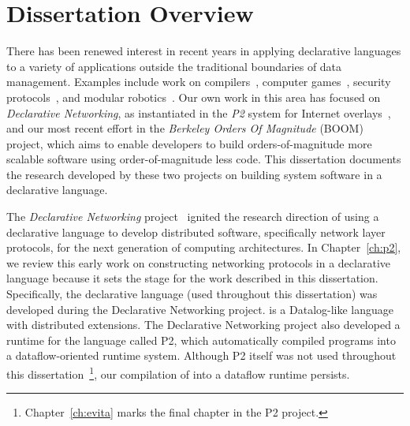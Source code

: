 \chapter[Dissertation Overview]{Dissertation Overview}
\label{ch:overview}

There has been renewed interest in recent years in applying declarative languages to a variety of 
applications outside the traditional boundaries of data management. Examples include work on 
compilers~\cite{lam05context}, computer games~\cite{white-sigmod07}, security protocols~\cite{li-padl03}, 
and modular robotics~\cite{ashley-iros07}. Our own work in this area has focused on {\em Declarative Networking},
as instantiated in the {\em P2} system for Internet overlays~\cite{p2:sosp, loo-sigmod06}, and our most recent effort in
the {\em Berkeley Orders Of Magnitude} (BOOM) project, which aims to enable developers to build orders-of-magnitude more
scalable software using order-of-magnitude less code. This dissertation documents the research developed by these two
projects on building system software in a declarative language. 

The {\em Declarative Networking} project~\cite{boon-thesis} ignited the research direction of using a declarative language to develop
distributed software, specifically network layer protocols, for the next generation of computing architectures. 
In Chapter~\ref{ch:p2}, we review this early work on constructing networking protocols in a declarative language because it sets 
the stage for the work described in this dissertation. Specifically, the declarative language \OVERLOG (used throughout 
this dissertation) was developed during the Declarative Networking project. \OVERLOG is a Datalog-like language with distributed 
extensions. The Declarative Networking project also developed a runtime for the \OVERLOG language called P2, 
which automatically compiled \OVERLOG programs into a dataflow-oriented runtime system. Although P2 itself was not used 
throughout this dissertation~\footnote{Chapter~\ref{ch:evita} marks the final chapter in the P2 project.}, our compilation of \OVERLOG 
into a dataflow runtime persists.

